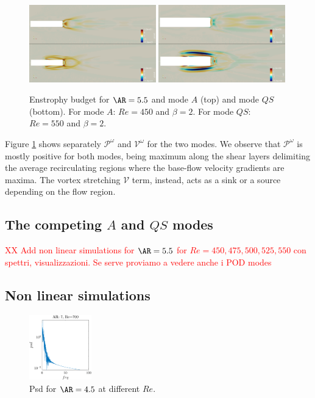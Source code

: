 \begin{figure}
  \centering
  \includegraphics[width=0.49\textwidth]{./fig/AR5p5/Prod_Re450_Re550_beta2_enst.png}
  \includegraphics[width=0.49\textwidth]{./fig/AR5p5/Vst_Re450_Re550_beta2_enst.png}
  \caption{Enstrophy budget for $\AR=5.5$ and mode $A$ (top) and mode $QS$ (bottom). For mode $A$: $Re=450$ and $\beta=2$. For mode $QS$: $Re=550$ and $\beta=2$.}
  \label{fig:enst_budget}
\end{figure}

Figure \ref{fig:enst_budget} shows separately $\mathcal{P}^\omega$ and $\mathcal{V}^\omega$ for the two modes. We observe that $\mathcal{P}^\omega$ is mostly positive for both modes, being maximum along the shear layers delimiting the average recirculating regions where the base-flow velocity gradients are maxima. The vortex stretching $\mathcal{V}$ term, instead, acts as a sink or a source depending on the flow region.
\fi

\subsection{The competing $A$ and $QS$ modes}

\textcolor{red}{XX Add non linear simulations for $\AR=5.5$ for $Re=450,475,500,525,550$ con spettri, visualizzazioni. Se serve proviamo a vedere anche i POD modes}


\subsection{Non linear simulations}

\begin{figure}
  \centering
  \includegraphics[width=0.24\textwidth]{./fig/nnl/psdAR7RE700.png}
  \caption{Psd for $\AR=4.5$ at different $Re$.}
  \label{fig:ClCd}
\end{figure}


